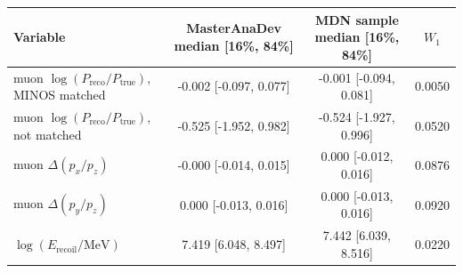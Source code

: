 \begin{tabular}{lccc}
\toprule
Variable & MasterAnaDev median [16\%, 84\%] & MDN sample median [16\%, 84\%] & $W_1$ \\
\midrule
muon $\log(P_\mathrm{reco}/P_\mathrm{true})$, MINOS matched & -0.002 [-0.097, 0.077] & -0.001 [-0.094, 0.081] & 0.0050 \\
muon $\log(P_\mathrm{reco}/P_\mathrm{true})$, not matched & -0.525 [-1.952, 0.982] & -0.524 [-1.927, 0.996] & 0.0520 \\
muon $\Delta(p_x/p_z)$ & -0.000 [-0.014, 0.015] & 0.000 [-0.012, 0.016] & 0.0876 \\
muon $\Delta(p_y/p_z)$ & 0.000 [-0.013, 0.016] & 0.000 [-0.013, 0.016] & 0.0920 \\
$\log(E_\mathrm{recoil}/\mathrm{MeV})$ & 7.419 [6.048, 8.497] & 7.442 [6.039, 8.516] & 0.0220 \\
\bottomrule
\end{tabular}
